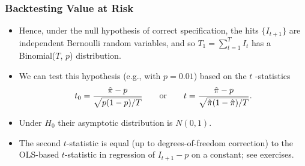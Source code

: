 \begin{frame}%

\frametitle{Backtesting Value at Risk}

\begin{itemize}
\item Hence, under the null hypothesis of correct specification, the hits
$\{I_{t+1}\}$ are independent Bernoulli random variables, and so $%
T_{1}=\sum_{t=1}^{T}I_{t}$ has a Binomial($T$, $p$) distribution.

\item We can test this hypothesis (e.g., with $p=0.01$) based on the $t$%
-statistics
\begin{equation*}
t_{0}=\frac{\hat{\pi}-p}{\sqrt{p(1-p)/T}}\qquad \text{or\qquad }t=\frac{\hat{%
\pi}-p}{\sqrt{\hat{\pi}(1-\hat{\pi})/T}}.
\end{equation*}

\item Under $H_{0}$ their asymptotic distribution is $N(0,1).$

\item The second $t$-statistic is equal (up to degrees-of-freedom
correction) to the OLS-based $t$-statistic in regression of $I_{t+1}-p$ on a
constant; see exercises.
\end{itemize}

\end{frame}%

